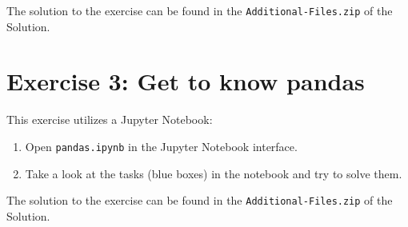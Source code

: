 \documentclass[
english,
smallborders
]{i6prcsht}
\begin{document}
\begin{solution}
	The solution to the exercise can be found in the \texttt{Additional-Files.zip} of the Solution.
\end{solution}

\section*{Exercise 3: Get to know pandas}

This exercise utilizes a Jupyter Notebook:

\begin{enumerate}
	\item Open \texttt{pandas.ipynb} in the Jupyter Notebook interface.
	\item Take a look at the tasks (blue boxes) in the notebook and try to solve them.
\end{enumerate}

\begin{solution}
	The solution to the exercise can be found in the \texttt{Additional-Files.zip} of the Solution.
\end{solution}
\end{document}
